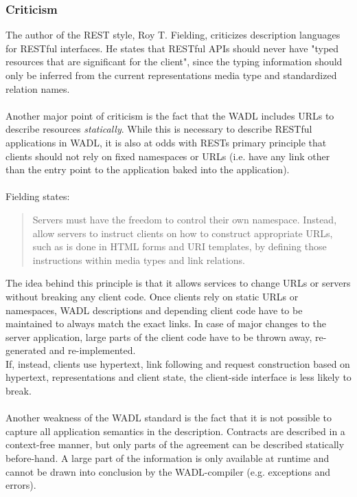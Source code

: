 \subsubsection*{Criticism}
The author of the REST style, Roy T. Fielding, criticizes description languages for RESTful interfaces. He states that RESTful APIs should never have "typed resources that are significant for the client", since the typing information should only be inferred from the current representations media type and standardized relation names.  \cite{FIELDBLOG}
\\ \\
Another major point of criticism is the fact that the WADL includes URLs to describe resources \emph{statically}. While this is necessary to describe RESTful applications in WADL, it is also at odds with RESTs primary principle that clients should not rely on fixed namespaces or URLs (i.e. have any link other than the entry point to the application baked into the application).
\\ \\
Fielding states:
\begin{quote}
Servers must have the freedom to control their own namespace. Instead, allow servers to instruct clients on how to construct appropriate URLs, such as is done in HTML forms and URI templates, by defining those instructions within media types and link relations. \cite{FIELDBLOG}
\end{quote}
The idea behind this principle is that it allows services to change URLs or servers without breaking any client code. Once clients rely on static URLs or namespaces, WADL descriptions and depending client code have to be maintained to always match the exact links. In case of major changes to the server application, large parts of the client code have to be thrown away, re-generated and re-implemented.
\\
If, instead, clients use hypertext, link following and request construction based on hypertext, representations and client state, the client-side interface is less likely to break. \cite{GREGBLOG}
\\ \\
Another weakness of the WADL standard is the fact that it is not possible to capture all application semantics in the description. Contracts are described in a context-free manner, but only parts of the agreement can be described statically before-hand. A large part of the information is only available at runtime and cannot be drawn into conclusion by the WADL-compiler (e.g. exceptions and errors).